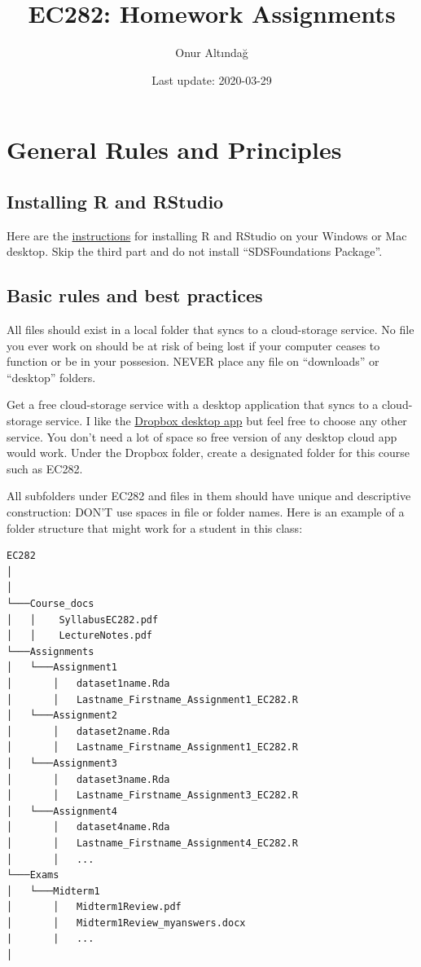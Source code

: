 \documentclass[
]{book}
\title{EC282: Homework Assignments}
\author{Onur Altındağ}
\date{Last update: 2020-03-29}
\begin{document}
\frontmatter
\maketitle

{
\setcounter{tocdepth}{1}
\tableofcontents
}
\mainmatter
\hypertarget{general-rules-and-principles}{%
\chapter{General Rules and Principles}\label{general-rules-and-principles}}

\hypertarget{installing-r-and-rstudio}{%
\section{Installing R and RStudio}\label{installing-r-and-rstudio}}

Here are the \href{https://courses.edx.org/courses/UTAustinX/UT.7.01x/3T2014/56c5437b88fa43cf828bff5371c6a924/}{instructions} for installing R and RStudio on your Windows or Mac desktop. Skip the third part and do not install ``SDSFoundations Package''.

\hypertarget{basic-rules-and-best-practices}{%
\section{Basic rules and best practices}\label{basic-rules-and-best-practices}}

All files should exist in a local folder that syncs to a cloud-storage service. No file you ever work on should be at risk of being lost if your computer ceases to function or be in your possesion. NEVER place any file on ``downloads'' or ``desktop'' folders.

Get a free cloud-storage service with a desktop application that syncs to a cloud-storage service. I like the \href{https://help.dropbox.com/installs-integrations/desktop/desktop-application-overview}{Dropbox desktop app} but feel free to choose any other service. You don't need a lot of space so free version of any desktop cloud app would work. Under the Dropbox folder, create a designated folder for this course such as EC282.

All subfolders under EC282 and files in them should have unique and descriptive construction: DON'T use spaces in file or folder names. Here is an example of a folder structure that might work for a student in this class:

\begin{verbatim}
EC282
│  
│
└───Course_docs
│   │    SyllabusEC282.pdf
│   │    LectureNotes.pdf 
└───Assignments
│   └───Assignment1
│       │   dataset1name.Rda
│       │   Lastname_Firstname_Assignment1_EC282.R
│   └───Assignment2
│       │   dataset2name.Rda
│       │   Lastname_Firstname_Assignment1_EC282.R
│   └───Assignment3
│       │   dataset3name.Rda
│       │   Lastname_Firstname_Assignment3_EC282.R
│   └───Assignment4
│       │   dataset4name.Rda
│       │   Lastname_Firstname_Assignment4_EC282.R
│       │   ...
└───Exams
│   └───Midterm1
│       │   Midterm1Review.pdf
│       │   Midterm1Review_myanswers.docx
|       |   ...
│   
\end{verbatim}
\end{document}
